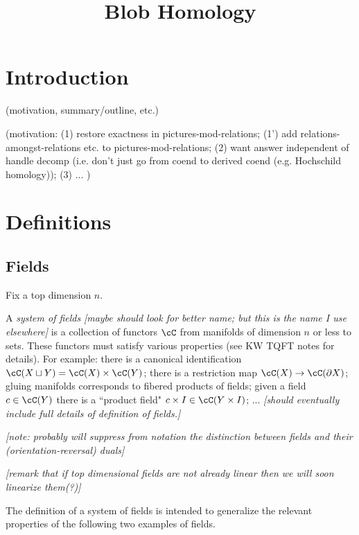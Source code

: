 \documentclass[11pt,leqno]{amsart}
\title{Blob Homology}
\def\du{\sqcup}
\def\bd{\partial}
\def\nn#1{{{\it \small [#1]}}}
\begin{document}
\makeatletter
{}
\gdef\theequation{\thesection.\arabic{equation}}
\makeatother


\maketitle

\section{Introduction}

(motivation, summary/outline, etc.)

(motivation:
(1) restore exactness in pictures-mod-relations;
(1') add relations-amongst-relations etc. to pictures-mod-relations;
(2) want answer independent of handle decomp (i.e. don't
just go from coend to derived coend (e.g. Hochschild homology));
(3) ...
)

\section{Definitions}

\subsection{Fields}

Fix a top dimension $n$.

A {\it system of fields}
\nn{maybe should look for better name; but this is the name I use elsewhere}
is a collection of functors $\cC$ from manifolds of dimension $n$ or less
to sets.
These functors must satisfy various properties (see KW TQFT notes for details).
For example:
there is a canonical identification $\cC(X \du Y) = \cC(X) \times \cC(Y)$;
there is a restriction map $\cC(X) \to \cC(\bd X)$;
gluing manifolds corresponds to fibered products of fields;
given a field $c \in \cC(Y)$ there is a ``product field"
$c\times I \in \cC(Y\times I)$; ...
\nn{should eventually include full details of definition of fields.}

\nn{note: probably will suppress from notation the distinction
between fields and their (orientation-reversal) duals}

\nn{remark that if top dimensional fields are not already linear
then we will soon linearize them(?)}

The definition of a system of fields is intended to generalize
the relevant properties of the following two examples of fields.
\end{document}
